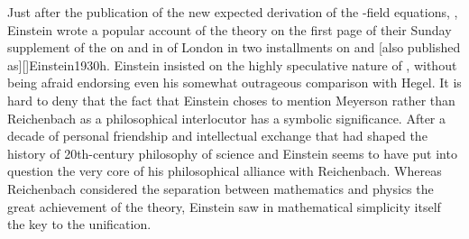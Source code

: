 \documentclass[draft]{article}
\newcommand{\FP}{\german{Fernparallelismus}\xspace}
\begin{document}
Just after the publication of the new expected derivation of the \FP-field equations, \citep{Einstein1929b}, Einstein wrote a popular account of the theory on the first page of their Sunday supplement of the  on  and in  of London in two installments on  and  [also published as][]{Einstein1930h}. Einstein insisted on the highly speculative nature of \uftp, without being afraid endorsing even his somewhat outrageous comparison with Hegel. It is hard to deny that the fact that Einstein choses to mention Meyerson rather than Reichenbach as a philosophical interlocutor has a symbolic significance. After a decade of personal friendship and intellectual exchange that had shaped the history of 20th-century philosophy of science and Einstein seems to have put into question the very core of his philosophical alliance with Reichenbach. Whereas Reichenbach considered the separation between mathematics and physics the great achievement of the theory, Einstein saw in mathematical simplicity itself the key to the unification.
\end{document}
